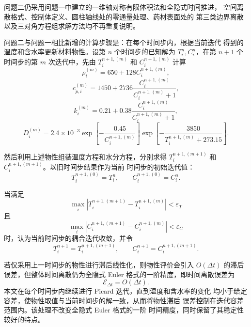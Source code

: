 \documentclass[12pt,a4paper]{article}
\begin{document}
\begin{center}
问题二仍采用问题一中建立的一维轴对称有限体积法和全隐式时间推进，
空间离散格式、控制体定义、圆柱轴线处的零通量处理、药材表面处的
第三类边界离散以及三对角方程组求解方法均不再重复说明。

问题二与问题一相比新增的计算步骤是：在每个时间步内，根据当前迭代
得到的温度和含水率更新材料物性。设第 $n$ 个时间步的已知解为
$T_i^n,C_i^n$，在第 $n+1$ 个时间步的第 $m$ 次迭代中，先由
$T_i^{n+1,(m)}$ 和 $C_i^{n+1,(m)}$ 计算
\begin{equation}
\rho_i^{(m)}
=
650+128C_i^{n+1,(m)},
\end{equation}
\begin{equation}
c_{p,i}^{(m)}
=
1450+2736
\frac{C_i^{n+1,(m)}}{C_i^{n+1,(m)}+1},
\end{equation}
\begin{equation}
k_i^{(m)}
=
0.21+0.38
\frac{C_i^{n+1,(m)}}{C_i^{n+1,(m)}+1},
\end{equation}
\begin{equation}
D_i^{(m)}
=
2.4\times10^{-3}
\exp\left[
-\frac{0.45}{C_i^{n+1,(m)}}
\right]
\exp\left[
-\frac{3850}{T_i^{n+1,(m)}+273.15}
\right].
\end{equation}

然后利用上述物性组装温度方程和水分方程，分别求得
$T_i^{n+1,(m+1)}$ 和 $C_i^{n+1,(m+1)}$。以旧时间步结果作为当前
时间步的初始迭代值：
\begin{equation}
T_i^{n+1,(0)}=T_i^n,\qquad
C_i^{n+1,(0)}=C_i^n.
\end{equation}

当满足
\begin{equation}
\max_i
\left|T_i^{n+1,(m+1)}-T_i^{n+1,(m)}\right|
<\varepsilon_T
\end{equation}
且
\begin{equation}
\max_i
\left|C_i^{n+1,(m+1)}-C_i^{n+1,(m)}\right|
<\varepsilon_C
\end{equation}
时，认为当前时间步的耦合迭代收敛，并令
\begin{equation}
T_i^{n+1}=T_i^{n+1,(m+1)},\qquad
C_i^{n+1}=C_i^{n+1,(m+1)}.
\end{equation}

若仅采用上一时间步的物性进行滞后线性化，则物性评价会引入
\(O(\Delta t)\) 的滞后误差，但整体时间离散仍为全隐式 Euler
格式的一阶精度，即时间离散误差为
\begin{equation}
\mathcal{E}_{\Delta t}=O(\Delta t).
\end{equation}
本文在每个时间步内继续进行 Picard 迭代，直到温度和含水率的变化
均小于给定容差，使物性取值与当前时间步的解一致，从而将物性滞后
误差控制在迭代容差范围内。该处理不改变全隐式 Euler 格式的一阶
时间精度，同时保留了其稳定性较好的特点。


\end{center}
\end{document}
